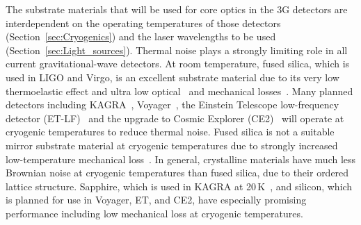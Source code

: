 The substrate materials that will be used for core optics in the \ac{3G}  detectors are interdependent on the operating temperatures of those detectors (Section~\ref{sec:Cryogenics}) and the laser wavelengths to be used (Section~\ref{sec:Light_sources}). 
Thermal noise plays a strongly limiting role in all current gravitational-wave detectors. At room temperature, fused silica, which is used in \ac{LIGO} and \ac{Virgo}, is an excellent substrate material due to its very low thermoelastic effect and ultra low optical~\cite{GEO_Absorption} and mechanical losses~\cite{Ageev_2004}. Many planned detectors
including \ac{KAGRA}~\cite{KAGRA2013}, \ac{Voyager}~\cite{VoyagerDCC2018}, the Einstein Telescope low-frequency detector (\ac{ET-LF})~\cite{ET2011} and the upgrade to Cosmic Explorer (CE2)~\cite{CosmicExplorer2017} will operate at cryogenic temperatures to reduce thermal noise. 
Fused silica is not a suitable mirror substrate material at cryogenic temperatures due to strongly increased low-temperature mechanical loss~\cite{Travasso_2007}.
In general, crystalline materials have much less Brownian noise at cryogenic temperatures than fused silica, due to their ordered lattice structure.
Sapphire, which is used in \ac{KAGRA} at 20\,K~\cite{Hirose_2014a}, and silicon, which is planned for use in \ac{Voyager}, \ac{ET}, and \ac{CE2}, have especially promising performance including low mechanical loss at cryogenic temperatures. 


